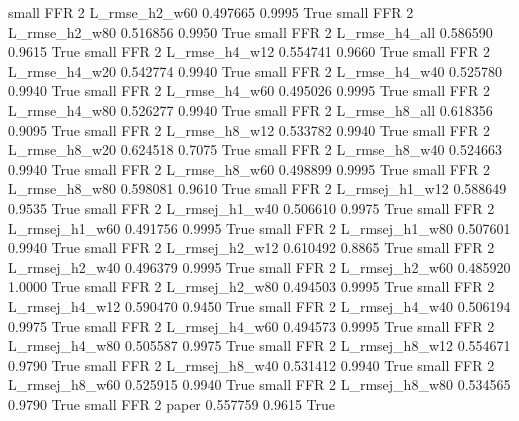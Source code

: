      small      FFR                 2  L_rmse_h2_w60   0.497665      0.9995    True
     small      FFR                 2  L_rmse_h2_w80   0.516856      0.9950    True
     small      FFR                 2  L_rmse_h4_all   0.586590      0.9615    True
     small      FFR                 2  L_rmse_h4_w12   0.554741      0.9660    True
     small      FFR                 2  L_rmse_h4_w20   0.542774      0.9940    True
     small      FFR                 2  L_rmse_h4_w40   0.525780      0.9940    True
     small      FFR                 2  L_rmse_h4_w60   0.495026      0.9995    True
     small      FFR                 2  L_rmse_h4_w80   0.526277      0.9940    True
     small      FFR                 2  L_rmse_h8_all   0.618356      0.9095    True
     small      FFR                 2  L_rmse_h8_w12   0.533782      0.9940    True
     small      FFR                 2  L_rmse_h8_w20   0.624518      0.7075    True
     small      FFR                 2  L_rmse_h8_w40   0.524663      0.9940    True
     small      FFR                 2  L_rmse_h8_w60   0.498899      0.9995    True
     small      FFR                 2  L_rmse_h8_w80   0.598081      0.9610    True
     small      FFR                 2 L_rmsej_h1_w12   0.588649      0.9535    True
     small      FFR                 2 L_rmsej_h1_w40   0.506610      0.9975    True
     small      FFR                 2 L_rmsej_h1_w60   0.491756      0.9995    True
     small      FFR                 2 L_rmsej_h1_w80   0.507601      0.9940    True
     small      FFR                 2 L_rmsej_h2_w12   0.610492      0.8865    True
     small      FFR                 2 L_rmsej_h2_w40   0.496379      0.9995    True
     small      FFR                 2 L_rmsej_h2_w60   0.485920      1.0000    True
     small      FFR                 2 L_rmsej_h2_w80   0.494503      0.9995    True
     small      FFR                 2 L_rmsej_h4_w12   0.590470      0.9450    True
     small      FFR                 2 L_rmsej_h4_w40   0.506194      0.9975    True
     small      FFR                 2 L_rmsej_h4_w60   0.494573      0.9995    True
     small      FFR                 2 L_rmsej_h4_w80   0.505587      0.9975    True
     small      FFR                 2 L_rmsej_h8_w12   0.554671      0.9790    True
     small      FFR                 2 L_rmsej_h8_w40   0.531412      0.9940    True
     small      FFR                 2 L_rmsej_h8_w60   0.525915      0.9940    True
     small      FFR                 2 L_rmsej_h8_w80   0.534565      0.9790    True
     small      FFR                 2          paper   0.557759      0.9615    True
